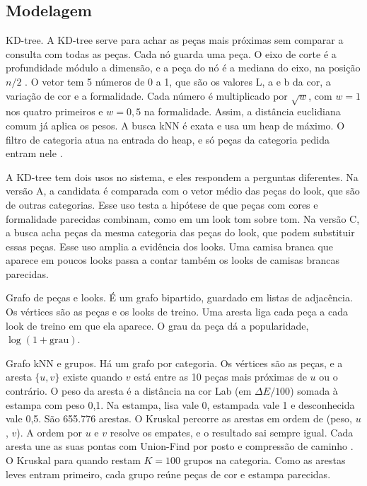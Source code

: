 \documentclass[conference]{IEEEtran}
\begin{document}
\subsection{Modelagem}

KD-tree. A KD-tree serve para achar as peças mais próximas sem comparar a consulta com todas as peças. Cada nó guarda uma peça. O eixo de corte é a profundidade módulo a dimensão, e a peça do nó é a mediana do eixo, na posição $n/2$ \cite{bentley1975}. O vetor tem 5 números de 0 a 1, que são os valores L, a e b da cor, a variação de cor e a formalidade. Cada número é multiplicado por $\sqrt{w}$, com $w = 1$ nos quatro primeiros e $w = 0{,}5$ na formalidade. Assim, a distância euclidiana comum já aplica os pesos. A busca kNN é exata e usa um heap de máximo. O filtro de categoria atua na entrada do heap, e só peças da categoria pedida entram nele \cite{friedman1977}.

A KD-tree tem dois usos no sistema, e eles respondem a perguntas diferentes. Na versão A, a candidata é comparada com o vetor médio das peças do look, que são de outras categorias. Esse uso testa a hipótese de que peças com cores e formalidade parecidas combinam, como em um look tom sobre tom. Na versão C, a busca acha peças da mesma categoria das peças do look, que podem substituir essas peças. Esse uso amplia a evidência dos looks. Uma camisa branca que aparece em poucos looks passa a contar também os looks de camisas brancas parecidas.

Grafo de peças e looks. É um grafo bipartido, guardado em listas de adjacência. Os vértices são as peças e os looks de treino. Uma aresta liga cada peça a cada look de treino em que ela aparece. O grau da peça dá a popularidade, $\log(1 + \text{grau})$.

Grafo kNN e grupos. Há um grafo por categoria. Os vértices são as peças, e a aresta $\{u, v\}$ existe quando $v$ está entre as 10 peças mais próximas de $u$ ou o contrário. O peso da aresta é a distância na cor Lab (em $\Delta E/100$) somada à estampa com peso 0,1. Na estampa, lisa vale 0, estampada vale 1 e desconhecida vale 0,5. São 655.776 arestas. O Kruskal \cite{kruskal1956} percorre as arestas em ordem de (peso, $u$, $v$). A ordem por $u$ e $v$ resolve os empates, e o resultado sai sempre igual. Cada aresta une as suas pontas com Union-Find por posto e compressão de caminho \cite{galler1964,tarjan1975}. O Kruskal para quando restam $K = 100$ grupos na categoria. Como as arestas leves entram primeiro, cada grupo reúne peças de cor e estampa parecidas.
\end{document}
